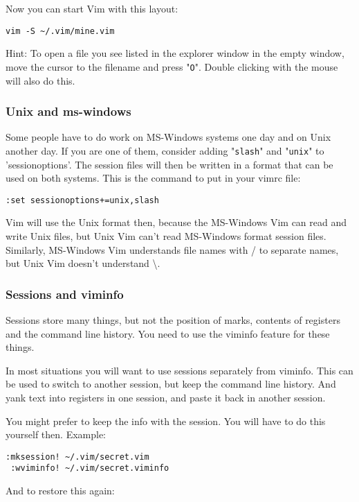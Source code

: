 Now you can start Vim with this layout:

\begin{Verbatim}[samepage=true]
 vim -S ~/.vim/mine.vim
\end{Verbatim}

Hint: To open a file you see listed in the explorer window in the empty window, move the cursor to the filename and press "\verb!O!".
Double clicking with the mouse will also do this.

\subsubsection{Unix and ms-windows}
Some people have to do work on MS-Windows systems one day and on Unix another day.
If you are one of them, consider adding "\verb!slash!" and "\verb!unix!" to 'sessionoptions'.
The session files will then be written in a format that can be used on both systems.
This is the command to put in your vimrc file:

\begin{Verbatim}[samepage=true]
 :set sessionoptions+=unix,slash
\end{Verbatim}

Vim will use the Unix format then, because the MS-Windows Vim can read and write Unix files, but Unix Vim can't read MS-Windows format session files.
Similarly, MS-Windows Vim understands file names with / to separate names, but Unix Vim doesn't understand \textbackslash.
\subsubsection{Sessions and viminfo}
Sessions store many things, but not the position of marks, contents of registers and the command line history.
You need to use the viminfo feature for these things.

In most situations you will want to use sessions separately from viminfo.
This can be used to switch to another session, but keep the command line history.
And yank text into registers in one session, and paste it back in another session.

You might prefer to keep the info with the session.
You will have to do this yourself then.
Example:

\begin{Verbatim}[samepage=true]
 :mksession! ~/.vim/secret.vim
 :wviminfo! ~/.vim/secret.viminfo
\end{Verbatim}

And to restore this again:

